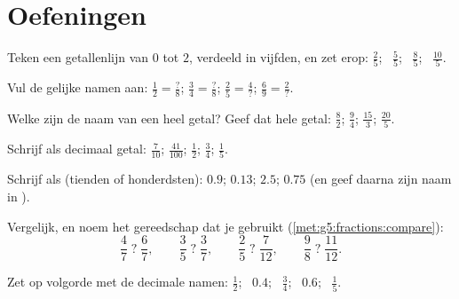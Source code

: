 \section{Oefeningen}

\begin{exercise}[$\star$]\label{exo:g5:fractions:1}
Teken een getallenlijn van $0$ tot $2$, verdeeld in vijfden, en zet erop:
$\frac25$; \ $\frac55$; \ $\frac85$; \ $\frac{10}{5}$.
\end{exercise}

\begin{exercise}[$\star$]\label{exo:g5:fractions:2}
Vul de gelijke namen aan:
$\frac12 = \frac{?}{8}$; \quad
$\frac34 = \frac{?}{8}$; \quad
$\frac{2}{5} = \frac{4}{?}$; \quad
$\frac{6}{9} = \frac{2}{?}$.
\end{exercise}

\begin{exercise}[$\star$]\label{exo:g5:fractions:3}
Welke  zijn de naam van een heel getal? Geef dat hele getal:
$\frac82$; \quad $\frac{9}{4}$; \quad $\frac{15}{3}$; \quad
$\frac{20}{5}$.
\end{exercise}

\begin{exercise}[$\star$]\label{exo:g5:fractions:4}
Schrijf als decimaal getal: $\frac{7}{10}$; \quad $\frac{41}{100}$; \quad
$\frac12$; \quad $\frac34$; \quad $\frac15$.
\end{exercise}

\begin{exercise}[$\star$]\label{exo:g5:fractions:5}
Schrijf als  (tienden of honderdsten): $0.9$; \quad $0.13$; \quad
$2.5$; \quad $0.75$ (en geef daarna zijn naam in ).
\end{exercise}

\begin{exercise}[$\star$]\label{exo:g5:fractions:6}
Vergelijk, en noem het gereedschap dat je gebruikt
(\cref{met:g5:fractions:compare}):
\[
\frac47 \;?\; \frac67, \qquad
\frac35 \;?\; \frac37, \qquad
\frac25 \;?\; \frac{7}{12}, \qquad
\frac98 \;?\; \frac{11}{12} .
\]
\end{exercise}

\begin{exercise}[$\star$]\label{exo:g5:fractions:7}
Zet op volgorde met de decimale namen: $\frac12$; \ $0.4$; \ $\frac34$; \
$0.6$; \ $\frac15$.
\end{exercise}


